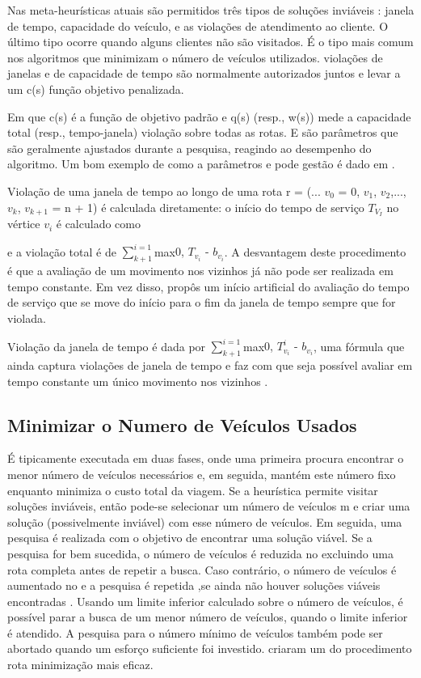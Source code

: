  

Nas meta-heurísticas atuais são permitidos três tipos de soluções inviáveis : janela de tempo, capacidade do veículo, e as violações de atendimento ao cliente. O último tipo ocorre quando alguns clientes não são visitados. É o tipo mais comum nos algoritmos que minimizam o número de veículos utilizados. violações de janelas e de capacidade de tempo são normalmente autorizados juntos e levar a um c(s) função objetivo penalizada.

Em que c(s) é a função de objetivo padrão e q(s) (resp., w(s)) mede a capacidade total (resp., tempo-janela) violação sobre todas as rotas. E são parâmetros que são geralmente ajustados durante a pesquisa, reagindo ao desempenho do algoritmo. Um bom exemplo de como a parâmetros e pode gestão é dado em \cite{cordeau01}.


Violação de uma janela de tempo ao longo de uma rota r = (... $v_0$ = 0, $v_1$, $v_2$,..., $v_k$, $v_{k + 1}$ = n + 1) é calculada diretamente: o início do tempo de serviço $T_{V_{I}}$ no vértice $v_i$ é calculado como 


e a violação total é de $ \sum_{k + 1}^{i = 1}$max{0, $T_{v_{i}}$ - $b_{v_{i}}$}. A desvantagem deste procedimento é que a avaliação de um movimento nos vizinhos já não pode ser realizada em tempo constante. Em vez disso, \cite{nagata10} propôs um início artificial do avaliação do tempo de serviço que se move do início para o fim da janela de tempo sempre que for violada.



Violação da janela de tempo é dada por $ \sum_{k + 1}^{i = 1}$max{0, $T_{v_{i}}^i$ - $b_{v_{i}}$}, uma fórmula que ainda captura violações de janela de tempo e faz com que seja possível avaliar em tempo constante um único movimento nos vizinhos \cite{gendreau10}.


\subsection{Minimizar o Numero de Veículos Usados }

É tipicamente executada em duas fases, onde uma primeira procura encontrar o menor número de veículos necessários e, em seguida, mantém este número fixo enquanto minimiza o custo total da viagem. Se a heurística permite visitar soluções inviáveis, então pode-se selecionar um número de veículos m e criar uma solução (possivelmente inviável) com esse número de veículos. Em seguida, uma pesquisa é realizada com o objetivo de encontrar uma solução viável. Se a pesquisa for bem sucedida, o número de veículos é reduzida no excluindo uma rota completa antes de repetir a busca. Caso contrário, o número de veículos é aumentado no e a pesquisa é repetida ,se ainda não houver soluções viáveis encontradas . Usando um limite inferior calculado sobre o número de veículos, é possível parar a busca de um menor número de veículos, quando o limite inferior é atendido. A pesquisa para o número mínimo de veículos também pode ser abortado quando um esforço suficiente foi investido. \cite{nagata10} criaram um do procedimento rota minimização mais eficaz.


